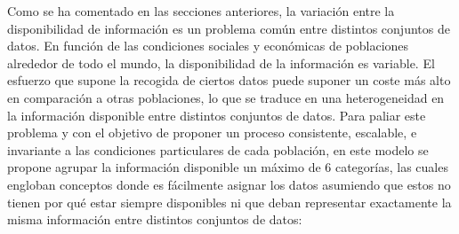 


Como se ha comentado en las secciones anteriores, la variación entre la disponibilidad de información es un problema común entre distintos conjuntos de datos. En función de las condiciones sociales y económicas de poblaciones alrededor de todo el mundo, la disponibilidad de la información es variable. El esfuerzo que supone la recogida de ciertos datos puede suponer un coste más alto en comparación a otras poblaciones, lo que se traduce en una heterogeneidad en la información disponible entre distintos conjuntos de datos. Para paliar este problema y con el objetivo de proponer un proceso consistente, escalable, e invariante a las condiciones particulares de cada población, en este modelo se propone agrupar la información disponible un máximo de 6 categorías, las cuales engloban conceptos donde es fácilmente asignar los datos asumiendo que estos no tienen por qué estar siempre disponibles ni que deban representar exactamente la misma información entre distintos conjuntos de datos:


